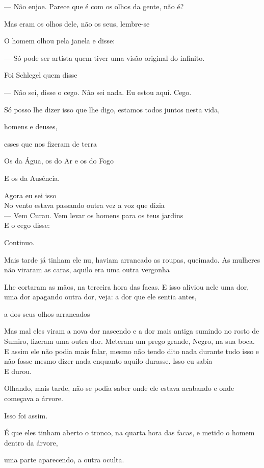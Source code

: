 --- Não enjoe. Parece que é com os olhos da gente, não é?

Mas eram os olhos dele, não os seus, lembre-se

O homem olhou pela janela e disse:

--- Só pode ser artista quem tiver uma visão original do infinito.

Foi Schlegel quem disse

--- Não sei, disse o cego. Não sei nada. Eu estou aqui. Cego.

Só posso lhe dizer isso que lhe digo, estamos todos juntos nesta vida,

homens e deuses,

esses que nos fizeram de terra

Os da Água, os do Ar e os do Fogo

E os da Ausência.

Agora eu sei isso\\

No vento estava passando outra vez a voz que dizia\\

--- Vem Curau. Vem levar os homens para os teus jardins\\

E o cego disse:

Continuo.

Mais tarde já tinham ele nu, haviam arrancado as roupas, queimado. As
mulheres não viraram as caras, aquilo era uma outra vergonha

Lhe cortaram as mãos, na terceira hora das facas. E isso aliviou nele
uma dor, uma dor apagando outra dor, veja: a dor que ele sentia antes,

a dos seus olhos arrancados

Mas mal eles viram a nova dor nascendo e a dor mais antiga sumindo no
rosto de Sumiro, fizeram uma outra dor. Meteram um prego grande, Negro,
na sua boca. E assim ele não podia mais falar, mesmo não tendo dito nada
durante tudo isso e não fosse mesmo dizer nada enquanto aquilo durasse.
Isso eu sabia\\

E durou.

Olhando, mais tarde, não se podia saber onde ele estava acabando e onde
começava a árvore.

Isso foi assim.

É que eles tinham aberto o tronco, na quarta hora das facas, e metido o
homem dentro da árvore,

uma parte aparecendo, a outra oculta.

